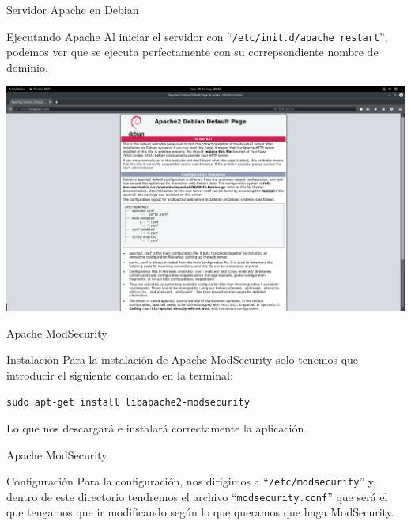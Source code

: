 \documentclass{beamer}
\begin{document}
\begin{frame}{Servidor Apache en Debian}
\begin{block}{Ejecutando Apache}
	Al iniciar el servidor con ``\texttt{/etc/init.d/apache restart}'', podemos ver que se ejecuta perfectamente con su correpsondiente nombre de dominio.
	\begin{center}
		\includegraphics[scale=0.15]{apache.png}
	\end{center}
\end{block}
\end{frame}

\begin{frame}{Apache ModSecurity}
\begin{block}{Instalación}
	Para la instalación de Apache ModSecurity solo tenemos que introducir el siguiente comando en la terminal:
	\begin{center}
		\texttt{sudo apt-get install libapache2-modsecurity}
	\end{center}
	Lo que nos descargará e instalará correctamente la aplicación.
\end{block}
\end{frame}

\begin{frame}{Apache ModSecurity}
\begin{block}{Configuración}
	Para la configuración, nos dirigimos a ``\texttt{/etc/modsecurity}'' y, dentro de este directorio tendremos el archivo ``\texttt{modsecurity.conf}'' que será el que tengamos que ir modificando según lo que queramos que haga ModSecurity.
\end{block}
\end{frame}
\end{document}
